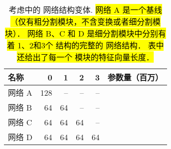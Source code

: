 \renewcommand{\captiontitle}{考虑中的 \CNN{} 网络结构变体}
\begin{table*}
\begin{center}
\begin{tabular}{lrrrrr} \hline
\toprule
名称      & \UNet{} 0 & \UNet{} 1 & \UNet{} 2 & \UNet{} 3 & 参数量（百万） \\
\midrule
网络 A & 128       & --        & --        & --        & \MillionsOfParamsA{} \\
网络 B & 64        & 64        & --        & --        & \MillionsOfParamsB{} \\
网络 C & 64        & 64        & 64        & --        & \MillionsOfParamsC{} \\
网络 D & 64        & 64        & 64        & 64        & \MillionsOfParamsD{} \\
\bottomrule
\end{tabular}
\caption[\captiontitle{}]{
\captiontitle{}.
\hl{
网络 A 是一个基线 \UNet{}（仅有粗分割模块，不含变换或者细分割模块）．
网络 B、C 和 D 是细分割模块中分别有着 1、2和3个 \UNet{} 结构的完整的 \omeganet{} 网络结构．
表中还给出了每一个 \UNet{} 模块的特征向量长度．
}
}
\label{tab:architecture-descriptions}
\end{center}
\end{table*}
